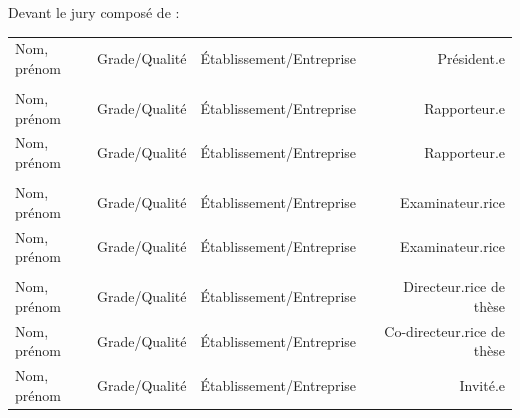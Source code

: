 \begin{titlepage}
\begin{center}
  \end{center}

  \vfill

  \noindent Devant le jury composé de :
  \vspace{2em}

  \noindent \begin{tabularx}{\linewidth}{lllr}
    Nom, prénom & Grade/Qualité & Établissement/Entreprise & {\color{red}Président.e} \\
    \\
    Nom, prénom & Grade/Qualité & Établissement/Entreprise & {\color{red}Rapporteur.e} \\
    Nom, prénom & Grade/Qualité & Établissement/Entreprise & {\color{red}Rapporteur.e} \\
    \\
    Nom, prénom & Grade/Qualité & Établissement/Entreprise & {\color{red}Examinateur.rice} \\
    Nom, prénom & Grade/Qualité & Établissement/Entreprise & {\color{red}Examinateur.rice} \\
    \\
    Nom, prénom & Grade/Qualité & Établissement/Entreprise & {\color{red}Directeur.rice de thèse} \\
    Nom, prénom & Grade/Qualité & Établissement/Entreprise & {\color{red}Co-directeur.rice de thèse} \\
    Nom, prénom & Grade/Qualité & Établissement/Entreprise & {\color{red}Invité.e} \\
  \end{tabularx}


\end{titlepage}
